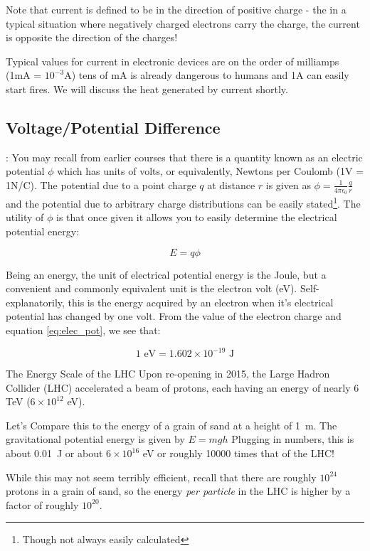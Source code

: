\documentclass{tufte-book}
\begin{document}
Note that current is defined to be in the direction of positive charge - the in a typical situation where negatively charged electrons carry the charge, the current is opposite the direction of the charges! 

Typical values for current in electronic devices are on the order of milliamps (1mA = $10^{-3}$A) tens of mA is already dangerous to humans and 1A can easily start fires. We will discuss the heat generated by current shortly. 

\subsection{Voltage/Potential Difference}: You may recall from earlier courses that there is a quantity known as an electric potential $\phi$ which has units  of volts, or equivalently, Newtons per Coulomb (1V = 1N/C). The potential due to a point charge $q$ at distance $r$ is given as $\phi = \frac{1}{4\pi\epsilon_0}\frac{q}{r}$ and the potential due to arbitrary charge distributions can be easily stated\footnote{Though not always easily calculated}. The utility of $\phi$ is that once given it allows you to easily determine the electrical potential energy:

\begin{equation}\label{eq:elec_pot}
E = q\phi
\end{equation}

Being an energy, the unit of electrical potential energy is the Joule, but a convenient and commonly equivalent unit is the electron volt (eV). Self-explanatorily, this is the energy acquired by an electron when it's electrical potential has changed by one volt. From the value of the electron charge and equation \ref{eq:elec_pot}, we see that:

\begin{equation}\label{eq:defn_eV}
1 \text{ eV} = 1.602\times10^{-19}\text{ J}
\end{equation}

\begin{myexample}[label = ex:energy_lhc]{The Energy Scale of the LHC}
Upon re-opening in 2015, the Large Hadron Collider (LHC) accelerated a beam of protons, each having an energy of nearly 6 TeV ($6\times10^{12}$ eV).

Let's Compare this to the energy of a grain of sand at a height of 1~m. The gravitational potential energy is given by $E = mgh$ Plugging in numbers, this is about 0.01~J or about $6\times10^{16}$ eV or roughly 10000 times that of the LHC!

While this may not seem terribly efficient, recall that there are roughly $10^{24}$ protons in a grain of sand, so the energy \textit{per particle} in the LHC is higher by a factor of roughly $10^{20}$.

\end{myexample}
\end{document}
